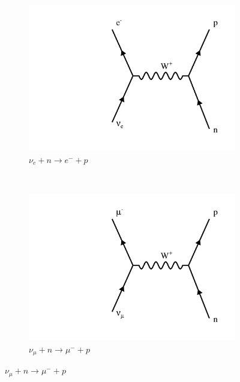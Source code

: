 \begin{figure}
\begin{center}
  \begin{subfigure}[b]{0.45\textwidth}
    \centering
    \includegraphics[width=\textwidth]{figures/feynman/ccNue.pdf}
    \caption*{$\nu_e + n \rightarrow e^- + p$}
     \label{ccNue}
  \end{subfigure}
  ~
  \begin{subfigure}[b]{0.45\textwidth}
    \centering
    \includegraphics[width=\textwidth]{figures/feynman/ccNumu.pdf}
    \caption*{$\nu_\mu + n \rightarrow \mu^- + p$}
    \label{ccNumu}
  \end{subfigure}


\end{center}
\end{figure}
